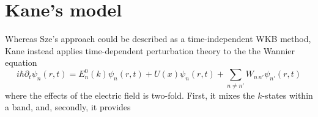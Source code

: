 \section{Kane's model}
Whereas Sze's approach could be described as a time-independent WKB method, Kane instead applies time-dependent perturbation theory to the the Wannier equation
$$i\hbar\partial_t\psi_n(r,t)=E_n^0(k)\psi_n(r,t)+U(x)\psi_n(r,t)+\sum_{n\neq n'} W_{n\,n'}\psi_{n'}(r,t)$$
where the effects of the electric field is two-fold.  First, it mixes the $k$-states within a band, and, secondly, it provides 